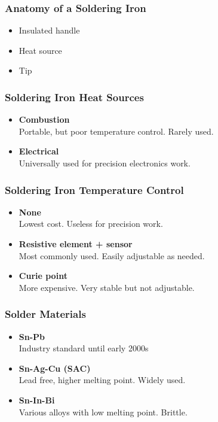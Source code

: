 \documentclass{beamer}
\begin{document}
\begin{frame}
\frametitle{Anatomy of a Soldering Iron}
\begin{itemize}
\item Insulated handle
\item Heat source
\item Tip
\end{itemize}
\end{frame}

\begin{frame}
\frametitle{Soldering Iron Heat Sources}
\begin{itemize}
\item \textbf{Combustion} \\
Portable, but poor temperature control. Rarely used.
\item \textbf{Electrical} \\
Universally used for precision electronics work.
\end{itemize}
\end{frame}

\begin{frame}
\frametitle{Soldering Iron Temperature Control}
\begin{itemize}
\item \textbf{None} \\
Lowest cost. Useless for precision work.
\item \textbf{Resistive element + sensor} \\
Most commonly used. Easily adjustable as needed.
\item \textbf{Curie point} \\
More expensive. Very stable but not adjustable.
\end{itemize}
\end{frame}

\begin{frame}
\frametitle{Solder Materials}
\begin{itemize}
\item \textbf{Sn-Pb} \\
Industry standard until early 2000s
\item \textbf{Sn-Ag-Cu (SAC)} \\
Lead free, higher melting point. Widely used.
\item \textbf{Sn-In-Bi} \\
Various alloys with low melting point. Brittle.
\end{itemize}
\end{frame}
\end{document}
